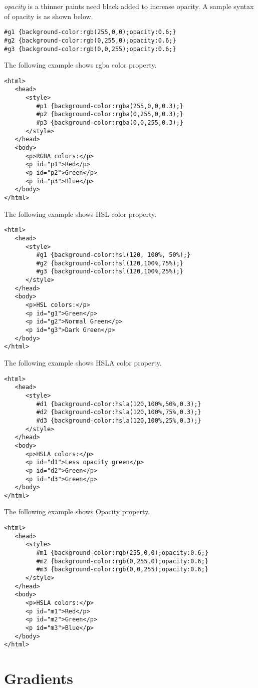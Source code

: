 \documentclass[a4paper,oneside]{book}
\numberwithin{equation}{chapter}
\begin{document}
\textit{opacity} is a thinner paints need black added to increase opacity. A sample syntax of opacity is as shown below.
\begin{verbatim}
#g1 {background-color:rgb(255,0,0);opacity:0.6;}  
#g2 {background-color:rgb(0,255,0);opacity:0.6;}  
#g3 {background-color:rgb(0,0,255);opacity:0.6;} 
\end{verbatim}
The following example shows rgba color property.
\begin{verbatim}
<html>
   <head>
      <style>
         #p1 {background-color:rgba(255,0,0,0.3);}
         #p2 {background-color:rgba(0,255,0,0.3);}
         #p3 {background-color:rgba(0,0,255,0.3);}
      </style>
   </head>
   <body>
      <p>RGBA colors:</p>
      <p id="p1">Red</p>
      <p id="p2">Green</p>
      <p id="p3">Blue</p>
   </body>
</html>
\end{verbatim}
The following example shows HSL color property.
\begin{verbatim}
<html>
   <head>
      <style>
         #g1 {background-color:hsl(120, 100%, 50%);}
         #g2 {background-color:hsl(120,100%,75%);}
         #g3 {background-color:hsl(120,100%,25%);}
      </style>
   </head>
   <body>
      <p>HSL colors:</p>
      <p id="g1">Green</p>
      <p id="g2">Normal Green</p>
      <p id="g3">Dark Green</p>
   </body>
</html>
\end{verbatim}
The following example shows HSLA color property.
\begin{verbatim}
<html>
   <head>
      <style>
         #d1 {background-color:hsla(120,100%,50%,0.3);}
         #d2 {background-color:hsla(120,100%,75%,0.3);}
         #d3 {background-color:hsla(120,100%,25%,0.3);}
      </style>
   </head>
   <body>
      <p>HSLA colors:</p>
      <p id="d1">Less opacity green</p>
      <p id="d2">Green</p>
      <p id="d3">Green</p>
   </body>
</html>
\end{verbatim}
The following example shows Opacity property.
\begin{verbatim}
<html>
   <head>
      <style>
         #m1 {background-color:rgb(255,0,0);opacity:0.6;} 
         #m2 {background-color:rgb(0,255,0);opacity:0.6;} 
         #m3 {background-color:rgb(0,0,255);opacity:0.6;}
      </style>
   </head>
   <body>
      <p>HSLA colors:</p>
      <p id="m1">Red</p>
      <p id="m2">Green</p>
      <p id="m3">Blue</p>
   </body>
</html>
\end{verbatim}
\section{Gradients}
\end{document}
